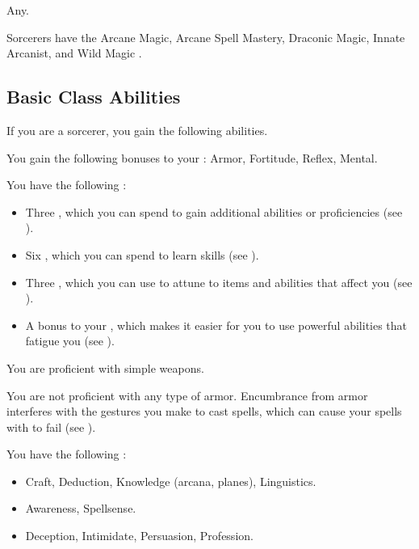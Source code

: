      Any.

     Sorcerers have the Arcane Magic, Arcane Spell Mastery, Draconic Magic, Innate Arcanist, and Wild Magic .

    \subsection{Basic Class Abilities}
        If you are a sorcerer, you gain the following abilities.

        You gain the following bonuses to your :  Armor,  Fortitude,  Reflex,  Mental.

         You have the following :
        \begin{itemize}
            \item Three , which you can spend to gain additional abilities or proficiencies (see ).
            \item Six , which you can spend to learn skills (see ).
            \item Three , which you can use to attune to items and abilities that affect you (see ).
            \item A  bonus to your , which makes it easier for you to use powerful abilities that fatigue you (see ).
        \end{itemize}

        You are proficient with simple weapons.

        You are not proficient with any type of armor.
        Encumbrance from armor interferes with the gestures you make to cast spells, which can cause your spells with  to fail (see ).

        You have the following :
        \begin{itemize}
            \item {} Craft, Deduction, Knowledge (arcana, planes), Linguistics.
            \item {} Awareness, Spellsense.
            \item {} Deception, Intimidate, Persuasion, Profession.
        \end{itemize}

